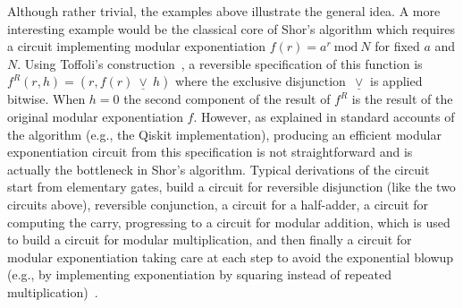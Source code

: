 Although rather trivial, the examples above illustrate the general idea. A more interesting example would be the
classical core of Shor's algorithm which requires a circuit implementing modular exponentiation $f(r) =
a^{r}~\mathrm{mod}~N$ for fixed $a$ and $N$. Using Toffoli's construction~\citeyearpar{Toffoli:1980}, a reversible
specification of this function is $f^R(r,h) = (r, f(r)~\underline{\vee}~ h)$ where the exclusive
disjunction~$\underline{\vee}$ is applied bitwise. When $h=0$ the second component of the result of $f^R$ is the result
of the original modular exponentiation $f$.
However, as explained in standard accounts of the algorithm (e.g., the
Qiskit implementation), producing an efficient modular exponentiation circuit
from this specification is not straightforward and is actually the bottleneck in
Shor’s algorithm. Typical derivations of the circuit start from elementary
gates, build a circuit for reversible disjunction (like the two circuits above),
reversible conjunction, a circuit for a half-adder, a circuit for computing the
carry, progressing to a circuit for modular addition, which is used to build a
circuit for modular multiplication, and then finally a circuit for modular
exponentiation taking care at each step to avoid the exponential blowup (e.g.,
by implementing exponentiation by squaring instead of repeated
multiplication)~\cite{shorefficient}.



